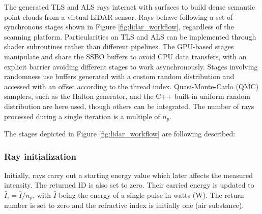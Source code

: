 The generated TLS and ALS rays interact with surfaces to build dense semantic point clouds from a virtual LiDAR sensor. Rays behave following a set of synchronous stages shown in Figure \ref{fig:lidar_workflow}, regardless of the scanning platform. Particularities on TLS and ALS can be implemented through shader subroutines rather than different pipelines. The GPU-based stages manipulate and share the SSBO buffers to avoid CPU data transfers, with an explicit barrier avoiding different stages to work asynchronously. Stages involving randomness use buffers generated with a custom random distribution and accessed with an offset according to the thread index. Quasi-Monte-Carlo (QMC) samplers, such as the Halton generator, and the C++ built-in uniform random distribution are here used, though others can be integrated. The number of rays processed during a single iteration is a multiple of $n_{p}$.

The stages depicted in Figure \ref{fig:lidar_workflow} are following described:

\subsubsection{Ray initialization}

Initially, rays carry out a starting energy value which later affects the measured intensity. The returned ID is also set to zero. Their carried energy is updated to $\bar{I}_{i} = \bar{I} / n_{p}$, with $\bar{I}$ being the energy of a single pulse in watts (\si{\watt}). The return number is set to zero and the refractive index is initially one (air substance). 


